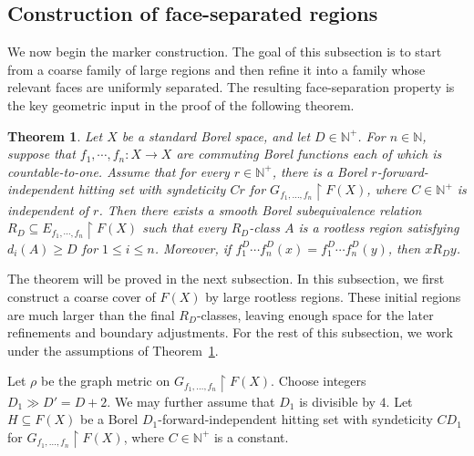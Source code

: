 \documentclass[11pt, reqno, a4paper]{amsart}
\newtheorem{theorem}{Theorem}[section]
\theoremstyle{definition}
\theoremstyle{plain}
\begin{document}






\subsection{Construction of face-separated regions}

We now begin the marker construction. The goal of this subsection is to start
from a coarse family of large regions and then refine it into a family whose
relevant faces are uniformly separated. The resulting face-separation property
is the key geometric input in the proof of the following theorem.

\begin{theorem}\label{thm:markers}
Let $X$ be a standard Borel space, and let $D\in\mathbb{N}^+$. For $n\in\mathbb{N}$, suppose that $f_1,\cdots ,f_n:X\to X$ are commuting Borel functions each of which is countable-to-one. Assume that for every $r\in\mathbb N^+$, there is a Borel $r$-forward-independent hitting set with syndeticity $Cr$ for $G_{f_1,\ldots,f_n}\upharpoonright F(X)$, where $C\in\mathbb N^+$ is independent of $r$. Then there exists a smooth Borel subequivalence relation
$R_D\subseteq E_{f_1,\cdots,f_n}\upharpoonright F(X)$
such that every $R_D$-class $A$ is a rootless region satisfying
$d_i(A)\ge D$ for $1\le i \le n$. Moreover, if $f_1^D\cdots f_n^D(x)=f_1^D\cdots f_n^D(y)$, then $ xR_D y$.
\end{theorem}

The theorem will be proved in the next subsection. In this subsection, we first construct a coarse cover of $F(X)$ by large
rootless regions. These initial regions are much larger than the final
$R_D$-classes, leaving enough space for the later refinements and boundary
adjustments. For the rest of this subsection, we work under the assumptions of
Theorem~\ref{thm:markers}.

Let $\rho$ be the graph metric on
$G_{f_1,\ldots,f_n}\upharpoonright F(X)$. Choose integers $D_1\gg D'=D+2$. We may further assume that $D_1$ is divisible by $4$. Let $H\subseteq F(X)$ be a Borel $D_1$-forward-independent hitting set with syndeticity $CD_1$ for
$G_{f_1,\ldots,f_n}\upharpoonright F(X)$, where $C\in\mathbb N^+$ is a constant.
\end{document}
